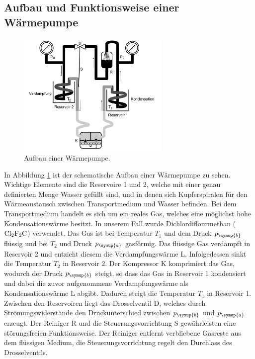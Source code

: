   \subsection{Aufbau und Funktionsweise einer Wärmepumpe}
  \begin{figure}
    \centering
    \includegraphics[width=0.65\textwidth]{aufbau_waermepumpe.png}
    \caption{Aufbau einer Wärmepumpe\cite{sample}.}
    \label{fig:aufbau}
  \end{figure}
  In Abbildung \ref{fig:aufbau} ist der schematische Aufbau einer Wärmepumpe zu
  sehen. Wichtige Elemente sind die Reservoire 1 und 2, welche mit einer genau
  definierten Menge Wasser gefüllt sind, und in denen sich Kupferspiralen für den
  Wärmeaustausch zwischen Transportmedium und Wasser befinden. Bei dem Transportmedium
  handelt es sich um ein reales Gas, welches eine möglichst hohe Kondensationswärme
  besitzt. In unserem Fall wurde Dichlordiflourmethan ($\ce{Cl2F2C}$) verwendet.
  Das Gas ist bei Temperatur $T_1$ und dem Druck $p_\symup{b}$ flüssig und bei
  $T_2$ und Druck $p_\symup{a}$ gasförmig. Das flüssige Gas verdampft in Reservoir
  2 und entzieht diesem die Verdampfungswärme L. Infolgedessen sinkt die
  Temperatur $T_2$ in Reservoir 2.
  Der Kompressor K komprimiert das Gas, wodurch der Druck $p_\symup{b}$ steigt,
  so dass das Gas in Reservoir 1 kondensiert und dabei die zuvor aufgenommene
  Verdampfungswärme als Kondensationswärme L abgibt. Dadurch steigt die
  Temperatur $T_1$ in Reservoir 1.
  Zwischen den Reservoiren liegt das Drosselventil D, welches durch Strömungswiderstände
  den Druckunterschied zwischen $p_\symup{b}$ und $p_\symup{a}$ erzeugt.
  Der Reiniger R und die Steuerungsvorrichtung S gewährleisten eine störungsfreien
  Funktionsweise. Der Reiniger entfernt verbliebene Gasreste aus dem flüssigen
  Medium, die Steuerungsvorrichtung regelt den Durchlass des Drosselventils.


